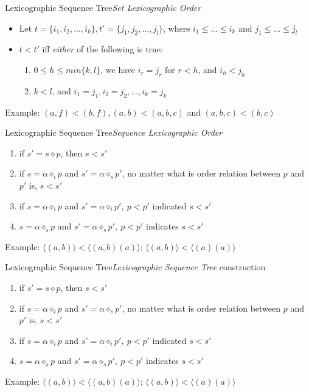 \documentclass[12pt]{beamer}
\begin{document}
\begin{frame}{Lexicographic Sequence Tree}{{\it Set Lexicographic Order}}
\begin{itemize}
\item Let $t = \{ i_1,i_2,...,i_k\}, t'=\{j_1,j_2,...,j_l\}$, where $i_1 \leq ... \leq i_k$ and $j_1 \leq ... \leq j_l$
\item $t < t'$ iff {\it either} of the following is true:
\begin{enumerate}
\item $0 \leq h \leq min\{k,l\}$, we have $i_r = j_r$ for $r < h$, and $i_h < j_h$
\item $k < l$, and $i_1 = j_1,i_2 = j_2,...,i_k=j_k$
\end{enumerate}
\end{itemize}
Example: $(a,f) < (b,f), (a,b) < (a,b,c)$ and $(a,b,c) < (b,c)$
\end{frame}

\begin{frame}{Lexicographic Sequence Tree}{{\it Sequence Lexicographic Order}}
\begin{enumerate}[i]
\item if $s' = s \diamond p$, then $s < s'$
\item if $s = \alpha \diamond_i p$ and $s' = \alpha \diamond_s p'$, no matter what is order relation between $p$ and $p'$ is, $s < s'$
\item if $ s = \alpha \diamond_i p$ and $s' = \alpha \diamond_i p',~p < p'$ indicated $s < s'$
\item $s = \alpha \diamond_s p$ and $s' = \alpha \diamond_s p',~p < p'$ indicates $s < s'$
\end{enumerate}
Example: $\langle (a,b) \rangle < \langle (a,b)(a) \rangle$; $\langle (a,b) \rangle < \langle (a)(a) \rangle$
\end{frame}

\begin{frame}{Lexicographic Sequence Tree}{{\it Lexicographic Sequence Tree} construction}
\begin{enumerate}[i]
\item if $s' = s \diamond p$, then $s < s'$
\item if $s = \alpha \diamond_i p$ and $s' = \alpha \diamond_s p'$, no matter what is order relation between $p$ and $p'$ is, $s < s'$
\item if $ s = \alpha \diamond_i p$ and $s' = \alpha \diamond_i p',~p < p'$ indicated $s < s'$
\item $s = \alpha \diamond_s p$ and $s' = \alpha \diamond_s p',~p < p'$ indicates $s < s'$
\end{enumerate}
Example: $\langle (a,b) \rangle < \langle (a,b)(a) \rangle$; $\langle (a,b) \rangle < \langle (a)(a) \rangle$
\end{frame}
\end{document}
